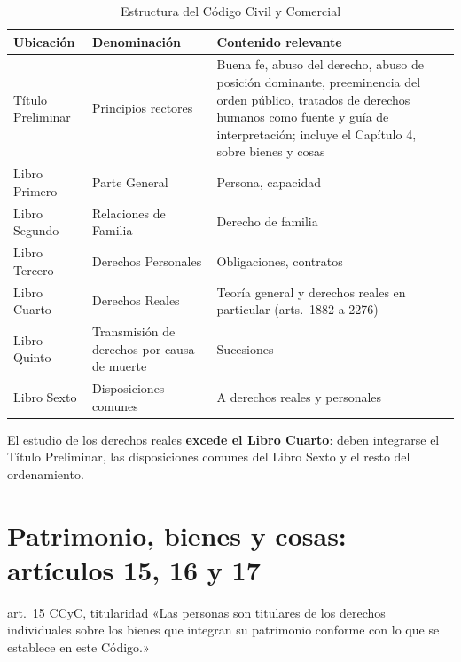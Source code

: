 \documentclass[12pt,oneside]{book}
\begin{document}
\begin{table}[H]
\centering
\small
\begin{tabularx}{\textwidth}{>{\raggedright\arraybackslash}p{}>{\raggedright\arraybackslash}p{}>{\raggedright\arraybackslash}X}
\toprule
\textbf{Ubicación} & \textbf{Denominación} & \textbf{Contenido relevante} \\
\midrule
Título Preliminar & Principios rectores & Buena fe, abuso del derecho, abuso de posición dominante, preeminencia del orden público, tratados de derechos humanos como fuente y guía de interpretación; incluye el Capítulo 4, sobre bienes y cosas \\
Libro Primero & Parte General & Persona, capacidad \\
Libro Segundo & Relaciones de Familia & Derecho de familia \\
Libro Tercero & Derechos Personales & Obligaciones, contratos \\
Libro Cuarto & Derechos Reales & Teoría general y derechos reales en particular (arts.~1882 a 2276) \\
Libro Quinto & Transmisión de derechos por causa de muerte & Sucesiones \\
Libro Sexto & Disposiciones comunes & A derechos reales y personales \\
\bottomrule
\end{tabularx}
\caption{Estructura del Código Civil y Comercial}
\end{table}

\begin{importante}
El estudio de los derechos reales \textbf{excede el Libro Cuarto}: deben integrarse el Título Preliminar, las disposiciones comunes del Libro Sexto y el resto del ordenamiento.
\end{importante}

\section{Patrimonio, bienes y cosas: artículos 15, 16 y 17}

\begin{regla}{art.~15 CCyC, titularidad}
«Las personas son titulares de los derechos individuales sobre los bienes que integran su patrimonio conforme con lo que se establece en este Código.»
\end{regla}
\end{document}
